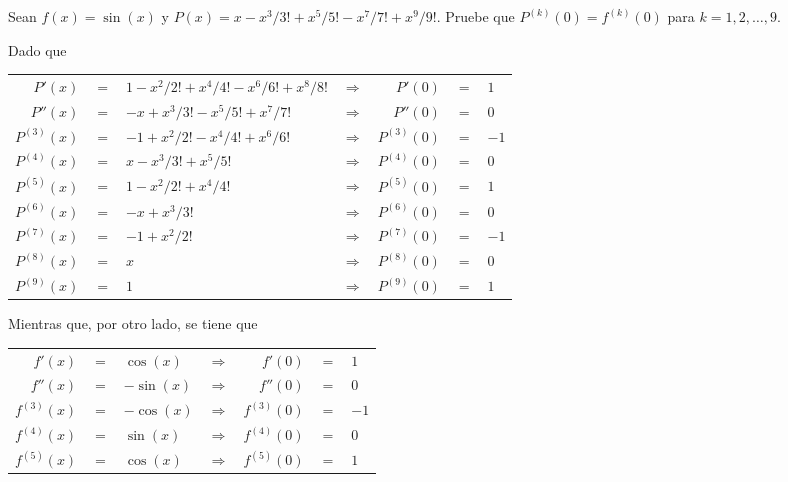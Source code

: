 \begin{enunciado}
 Sean $f(x) = \sin(x)$ y $P(x) = x - x^3/3! + x^5/5! - x^7/7! + x^9/9!$. Pruebe que $P^{(k)}(0) = f^{(k)}(0)$ para $k=1,2,\ldots, 9$.
\end{enunciado}

\begin{solucion}
 Dado que
 \begin{center}
  \begin{tabular}{rclcrcl}
   $P'(x)$ & $=$ & $1 - x^2/2! + x^4/4! - x^6/6! + x^8/8!$ & \hspace{1cm} $\Rightarrow$ \hspace{1cm} & $P'(0)$ & $=$ & $1$ \\
   $P''(x)$ & $=$ & $-x + x^3/3! - x^5/5! + x^7/7!$ & $\Rightarrow$ & $P''(0)$ & $=$ & $0$ \\
   $P^{(3)}(x)$ & $=$ & $-1 + x^2/2! - x^4/4! + x^6/6!$ & $\Rightarrow$ & $P^{(3)}(0)$ & $=$ & $-1$ \\
   $P^{(4)}(x)$ & $=$ & $x - x^3/3! + x^5/5!$ & $\Rightarrow$ & $P^{(4)}(0)$ & $=$ & $0$ \\
   $P^{(5)}(x)$ & $=$ & $1 - x^2/2! + x^4/4!$ & $\Rightarrow$ & $P^{(5)}(0)$ & $=$ & $1$ \\
   $P^{(6)}(x)$ & $=$ & $-x + x^3/3!$ & $\Rightarrow$ & $P^{(6)}(0)$ & $=$ & $0$ \\
   $P^{(7)}(x)$ & $=$ & $-1 + x^2/2!$ & $\Rightarrow$ & $P^{(7)}(0)$ & $=$ & $-1$ \\
   $P^{(8)}(x)$ & $=$ & $x$ & $\Rightarrow$ & $P^{(8)}(0)$ & $=$ & $0$ \\ 
   $P^{(9)}(x)$ & $=$ & $1$ & $\Rightarrow$ & $P^{(9)}(0)$ & $=$ & $1$
  \end{tabular}
 \end{center}
 Mientras que, por otro lado, se tiene que
 \begin{center}
  \begin{tabular}{rclcrcl}
   $f'(x)$ & $=$ & $\cos(x)$ & \hspace{1cm} $\Rightarrow$ \hspace{1cm} & $f'(0)$ & $=$ & $1$ \\
   $f''(x)$ & $=$ & $-\sin(x)$ & $\Rightarrow$ & $f''(0)$ & $=$ & $0$ \\
   $f^{(3)}(x)$ & $=$ & $-\cos(x)$ & $\Rightarrow$ & $f^{(3)}(0)$ & $=$ & $-1$ \\
   $f^{(4)}(x)$ & $=$ & $\sin(x)$ & $\Rightarrow$ & $f^{(4)}(0)$ & $=$ & $0$ \\
   $f^{(5)}(x)$ & $=$ & $\cos(x)$ & $\Rightarrow$ & $f^{(5)}(0)$ & $=$ & $1$ \\

\end{tabular}
\end{center}
\end{solucion}
